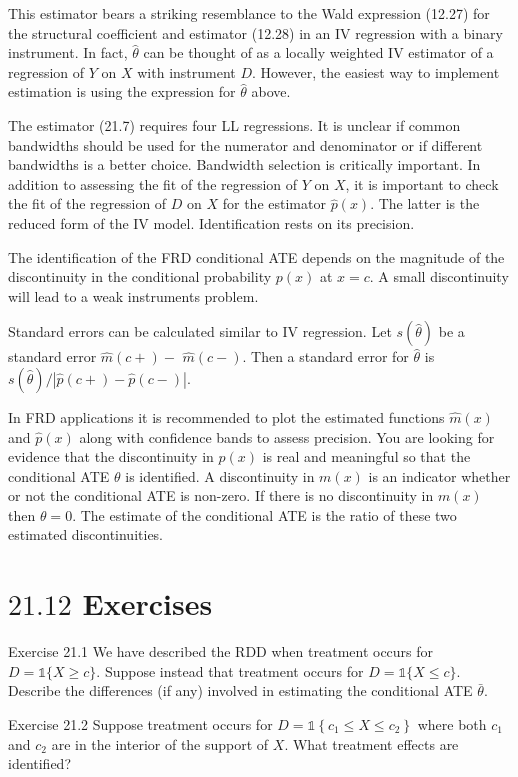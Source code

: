 \documentclass[10pt]{article}
\begin{document}
This estimator bears a striking resemblance to the Wald expression (12.27) for the structural coefficient and estimator (12.28) in an IV regression with a binary instrument. In fact, $\widehat{\theta}$ can be thought of as a locally weighted IV estimator of a regression of $Y$ on $X$ with instrument $D$. However, the easiest way to implement estimation is using the expression for $\widehat{\theta}$ above.

The estimator (21.7) requires four LL regressions. It is unclear if common bandwidths should be used for the numerator and denominator or if different bandwidths is a better choice. Bandwidth selection is critically important. In addition to assessing the fit of the regression of $Y$ on $X$, it is important to check the fit of the regression of $D$ on $X$ for the estimator $\hat{p}(x)$. The latter is the reduced form of the IV model. Identification rests on its precision.

The identification of the FRD conditional ATE depends on the magnitude of the discontinuity in the conditional probability $p(x)$ at $x=c$. A small discontinuity will lead to a weak instruments problem.

Standard errors can be calculated similar to IV regression. Let $s(\widehat{\theta})$ be a standard error $\widehat{m}(c+)-$ $\widehat{m}(c-)$. Then a standard error for $\widehat{\theta}$ is $s(\widehat{\theta}) /|\widehat{p}(c+)-\widehat{p}(c-)|$.

In FRD applications it is recommended to plot the estimated functions $\widehat{m}(x)$ and $\widehat{p}(x)$ along with confidence bands to assess precision. You are looking for evidence that the discontinuity in $p(x)$ is real and meaningful so that the conditional ATE $\theta$ is identified. A discontinuity in $m(x)$ is an indicator whether or not the conditional ATE is non-zero. If there is no discontinuity in $m(x)$ then $\theta=0$. The estimate of the conditional ATE is the ratio of these two estimated discontinuities.

\section{$21.12$ Exercises}
Exercise 21.1 We have described the RDD when treatment occurs for $D=\mathbb{1}\{X \geq c\}$. Suppose instead that treatment occurs for $D=\mathbb{1}\{X \leq c\}$. Describe the differences (if any) involved in estimating the conditional ATE $\bar{\theta}$.

Exercise 21.2 Suppose treatment occurs for $D=\mathbb{1}\left\{c_{1} \leq X \leq c_{2}\right\}$ where both $c_{1}$ and $c_{2}$ are in the interior of the support of $X$. What treatment effects are identified?
\end{document}
